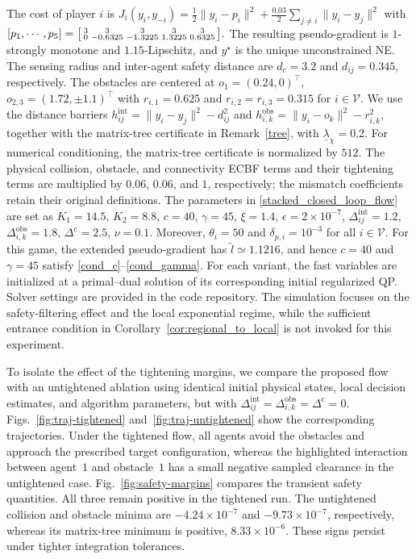 The cost of player $i$ is
$
J_i(y_i,y_{-i})
=
\frac{1}{2}\|y_i-p_i\|^2
+
\frac{0.03}{2}
\sum_{j\ne i}\|y_i-y_j\|^2
$ with
$[p_1,\cdots,p_5] = \begin{bsmallmatrix} 3 & 3 & 3 & 3 & 3 \\ 0 & -0.6325 & -1.3225 & 1.3225 & 0.6325 \end{bsmallmatrix}.$
The resulting pseudo-gradient is $1$-strongly monotone and
$1.15$-Lipschitz, and $y^\star$ is the unique unconstrained NE.
The sensing radius and inter-agent safety distance are
$d_c=3.2$ and $d_{ij}=0.345$, respectively.
The obstacles are centered at
$
o_1=(0.24,0)^\top$, $
o_{2,3}=(1.72,\pm1.1)^\top
$
with
$
r_{i,1}=0.625$ and $
r_{i,2}=r_{i,3}=0.315$ for $i\in\mathcal V.
$
We use the distance barriers
$
h_{ij}^{\mathrm{int}}
=
\|y_i-y_j\|^2-d_{ij}^2$ and
$
h_{i,k}^{\mathrm{obs}}
=
\|y_i-o_k\|^2-r_{i,k}^2$, together with the matrix-tree certificate in
Remark~\ref{tree}, with $\underline{\lambda}_\chi=0.2$. For numerical conditioning, the matrix-tree certificate is normalized
by $512$. The physical collision, obstacle, and connectivity ECBF
terms and their tightening terms are multiplied by $0.06$, $0.06$,
and $1$, respectively; the mismatch coefficients retain their
original definitions.
The parameters in \eqref{stacked_closed_loop_flow} are set as
$K_1 = 14.5$, $K_2 = 8.8$, $c = 40$, $\gamma = 45$, $\xi = 1.4$, $\epsilon = 2\times10^{-7}$, $\Delta_{ij}^{\mathrm{int}} = 1.2$, $\Delta_{i,k}^{\mathrm{obs}} = 1.8$, $\Delta^{\mathrm{c}} = 2.5$, $\nu = 0.1$.
Moreover, $\theta_i=50$ and $\delta_{p,i}=10^{-3}$ for all
$i\in\mathcal V$. For this game, the extended pseudo-gradient has
$\tilde l\simeq1.1216$, and hence $c=40$ and $\gamma=45$
satisfy \eqref{cond_c}--\eqref{cond_gamma}. For each variant, the fast variables are initialized at a
primal--dual solution of its corresponding initial regularized QP.
Solver settings are provided in the code repository. The simulation focuses on the safety-filtering effect and the local
exponential regime, while the sufficient entrance condition in
Corollary~\ref{cor:regional_to_local} is not invoked for this experiment.

To isolate the effect of the tightening margins, we compare the
proposed flow with an untightened ablation using identical initial
physical states, local decision estimates, and algorithm parameters,
but with
$
\Delta_{ij}^{\mathrm{int}}
=
\Delta_{i,k}^{\mathrm{obs}}
=
\Delta^{\mathrm c}
=
0.
$
Figs.~\ref{fig:traj-tightened} and~\ref{fig:traj-untightened}
show the corresponding trajectories. Under the tightened flow, all
agents avoid the obstacles and approach the prescribed target
configuration, whereas the highlighted interaction between agent~$1$
and obstacle~$1$ has a small negative sampled clearance in the untightened case.
Fig.~\ref{fig:safety-margins} compares the transient safety
quantities. All three remain positive in the tightened run. The
untightened collision and obstacle minima are $-4.24\times10^{-7}$
and $-9.73\times10^{-7}$, respectively, whereas its matrix-tree
minimum is positive, $8.33\times10^{-6}$. These signs persist under
tighter integration tolerances.

